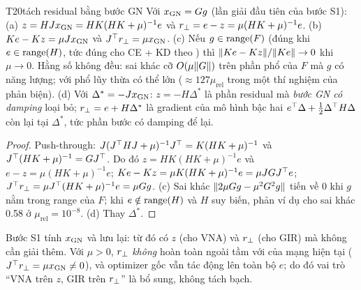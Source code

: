 \begin{namedthm}{T20}{tách residual bằng bước GN}
Với $x_{\mathrm{GN}}=Gg$ (lần giải đầu tiên của bước S1):
(a) $z=HJx_{\mathrm{GN}}=HK(HK+\mu)^{-1}e$ và $r_{\perp}=e-z=\mu(HK+\mu)^{-1}e$.
(b) $Ke-Kz=\mu Jx_{\mathrm{GN}}$ và $J^{\top}r_{\perp}=\mu x_{\mathrm{GN}}$.
(c) Nếu $g\in\operatorname{range}(F)$ (đúng khi $e\in\operatorname{range}(H)$, tức đúng cho CE + KD theo ) thì $\lVert Ke-Kz\rVert/\lVert Ke\rVert\to0$ khi $\mu\to0$. Hằng số không đều: sai khác cỡ $O(\mu\lVert G\rVert)$ trên phần phổ của $F$ mà $g$ có năng lượng; với phổ lũy thừa có thể lớn ($\approx127\mu_{\mathrm{rel}}$ trong một thí nghiệm của phản biện).
(d) Với $\Delta^*=-Jx_{\mathrm{GN}}$: $z=-H\Delta^*$ là phần residual mà \emph{bước GN có damping} loại bỏ; $r_{\perp}=e+H\Delta^*$ là gradient của mô hình bậc hai $e^{\top}\Delta+\tfrac12\Delta^{\top} H\Delta$ còn lại tại $\Delta^*$, tức phần bước có damping để lại.
\end{namedthm}
\begin{proof}
Push-through: $J(J^{\top} HJ+\mu)^{-1}J^{\top}=K(HK+\mu)^{-1}$ và $J^{\top}(HK+\mu)^{-1}=GJ^{\top}$. Do đó $z=HK(HK+\mu)^{-1}e$ và $e-z=\mu(HK+\mu)^{-1}e$; $Ke-Kz=\mu K(HK+\mu)^{-1}e=\mu JGJ^{\top} e$; $J^{\top}r_{\perp}=\mu J^{\top}(HK+\mu)^{-1}e=\mu Gg$. (c) Sai khác $\lVert 2\mu Gg-\mu^2G^2g\rVert$ tiến về $0$ khi $g$ nằm trong range của $F$; khi $e\notin\operatorname{range}(H)$ và $H$ suy biến, phản ví dụ cho sai khác 0.58 ở $\mu_{\mathrm{rel}}=10^{-8}$. (d) Thay $\Delta^*$.
\end{proof}
\begin{hequa}
Bước S1 tính $x_{\mathrm{GN}}$ và lưu lại: từ đó có $z$ (cho VNA) và $r_{\perp}$ (cho GIR) mà không cần giải thêm. Với $\mu>0$, $r_{\perp}$ \emph{không} hoàn toàn ngoài tầm với của mạng hiện tại ($J^{\top}r_{\perp}=\mu x_{\mathrm{GN}}\ne0$), và optimizer gốc vẫn tác động lên toàn bộ $e$; do đó vai trò ``VNA trên $z$, GIR trên $r_{\perp}$'' là bổ sung, không tách bạch.
\end{hequa}

